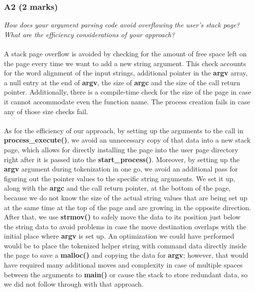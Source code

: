 \documentclass{report}
\newcommand{\question}[1]{\textit{#1} \ }
\newcommand{\fun}[1]{\textcolor{Emerald}{\textbf{#1}}}
\newcommand{\var}[1]{\textcolor{RoyalPurple}{\textbf{#1}}}
\begin{document}
            \subsubsection*{A2 (2 marks)}
                \question{How does your argument parsing code avoid overflowing the user's stack page? What are the efficiency considerations
                 of your approach?}
								\\
								\\ A stack page overflow is avoided by checking for the amount of free space left on the page every time we want to add a new string argument.
                                This check accounts for the word alignment of the input strings, additional pointer in the \var{argv} array, a null entry at the end of \var{argv},
                                the size of \var{argc} and the size of the call return pointer. Additionally, there is a compile-time check for the size of the page
                                in case it cannot accommodate even the function name. The process creation fails in case any of those size checks fail.
                \\
                                \\ As for the efficiency of our approach, by setting up the arguments to the call in \fun{process\_execute()},
                                we avoid an unnecessary copy of that data into a new stack page, which allows for directly installing the page
                                into the user page directory right after it is passed into the \fun{start\_process()}. Moreover, by setting up the
                                \var{argv} argument during tokenization in one go, we avoid an additional pass for figuring out the pointer values
                                to the specific string arguments. We set it up, along with the \var{argc} and the call return pointer, at the bottom of the page, because
                                we do not know the size of the actual string values that are being set up at the same time at the top of the page and are growing in
                                the opposite direction. After that, we use \fun{strmov()} to safely move the data to its position just below the string data
                                to avoid problems in case the move destination overlaps with the initial place where \var{argv} is set up. An optimization we
                                could have performed would be to place the tokenized helper string with command data directly inside the page to save a \fun{malloc()} and
                                copying the data for \var{argv}; however, that would have required many additional moves and complexity in case of multiple spaces 
                                between the arguments to \fun{main()} or cause the stack to store redundant data, so we did not follow through with that approach.
        
\end{document}
